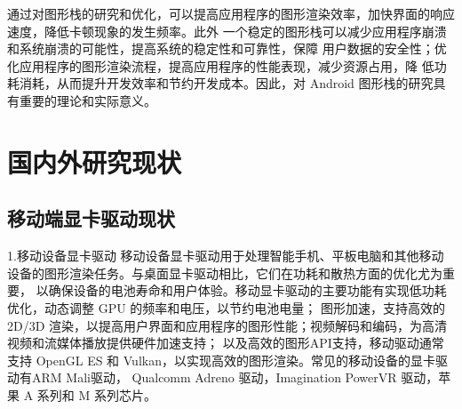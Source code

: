 通过对图形栈的研究和优化，可以提高应用程序的图形渲染效率，加快界面的响应速度，降低卡顿现象的发生频率。此外
一个稳定的图形栈可以减少应用程序崩溃和系统崩溃的可能性，提高系统的稳定性和可靠性，保障
用户数据的安全性；优化应用程序的图形渲染流程，提高应用程序的性能表现，减少资源占用，降
低功耗消耗，从而提升开发效率和节约开发成本。因此，对 Android 图形栈的研究具有重要的理论和实际意义。








\section{国内外研究现状}
\subsection{移动端显卡驱动现状}
1.移动设备显卡驱动
移动设备显卡驱动用于处理智能手机、平板电脑和其他移动设备的图形渲染任务。与桌面显卡驱动相比，它们在功耗和散热方面的优化尤为重要，
以确保设备的电池寿命和用户体验。移动显卡驱动的主要功能有实现低功耗优化，动态调整 GPU 的频率和电压，以节约电池电量；
图形加速，支持高效的 2D/3D 渲染，以提高用户界面和应用程序的图形性能；视频解码和编码，为高清视频和流媒体播放提供硬件加速支持；
以及高效的图形API支持，移动驱动通常支持 OpenGL ES 和 Vulkan，以实现高效的图形渲染。常见的移动设备的显卡驱动有ARM Mali驱动，
Qualcomm Adreno 驱动，Imagination PowerVR 驱动，苹果 A 系列和 M 系列芯片。


